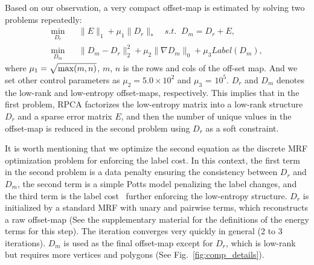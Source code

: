 
%
%
Based on our observation, a very compact offset-map is estimated by solving two problems repeatedly:
\begin{eqnarray}
 \min_{D_r}&& \|E\|_1 + \mu_1 \|D_r\|_*\quad s.t.\;\; D_m
 = D_r + E, \nonumber \\
 \min_{D_m}&& \|D_m-D_r\|^2_2 + \mu_2\|\nabla D_m\|_0 + \mu_3Label(D_m) \label{eq:sub2},
\end{eqnarray}
where $\mu_1 = \sqrt{{\rm max}(m,n)}$, $m$, $n$ is the rows and cols of the off-set map. And we set other control parameters as $\mu_2=5.0\times 10^2$ and $\mu_3$ = $10^5$. $D_r$ and $D_m$ denotes the low-rank and low-entropy offset-maps, respectively. This implies that in the first problem, RPCA factorizes the low-entropy matrix into a low-rank structure $D_r$ and a sparse error matrix $E$, and then the number of unique values in the offset-map is reduced in the second problem using $D_r$ as a soft constraint. 

It is worth mentioning that we optimize the second equation as the discrete MRF optimization problem for enforcing the label cost. In this context, the first term in the second problem is a data penalty ensuring the consistency between $D_r$ and $D_m$, the second term is a simple Potts model penalizing the label changes, and the third term is the label cost~\cite{Delong2012} further enforcing the low-entropy structure. 
$D_r$ is initialized 
by a standard MRF with unary and pairwise terms, which reconstructs a raw
offset-map
(See the supplementary material for the definitions of the energy
terms for this step).
%
The iteration converges very quickly in general (2 to 3
iterations). $D_m$ is used as the final offset-map except for $D_r$,
which is low-rank but requires more vertices and polygons (See
Fig.~\ref{fig:comp_details}).


